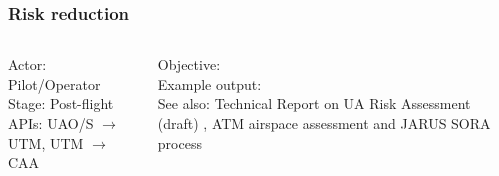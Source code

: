 \documentclass[usenames,dvipsnames,aspectratio=169,serif]{beamer}
\begin{document}
\begin{frame}
   \frametitle{Risk reduction}
   \begin{columns}[t]
      \begin{column}{0.5\textwidth}
         Actor: Pilot/Operator \\
         Stage: Post-flight \\
         APIs: UAO/S $\rightarrow$ UTM, UTM $\rightarrow$ CAA \\
      \end{column}
      \begin{column}{0.5\textwidth}
         Objective: \\
         Example output: \\
         See also: Technical Report on UA Risk Assessment (draft) \cite{UARRG-TR-1}, ATM airspace assessment \cite{EASA-UAS-ATM-Assessment-2018} and JARUS SORA process\cite{JARUS-SORA/JAR-DEL-WG6-D.04}
      \end{column}
   \end{columns}
\end{frame}
\end{document}
